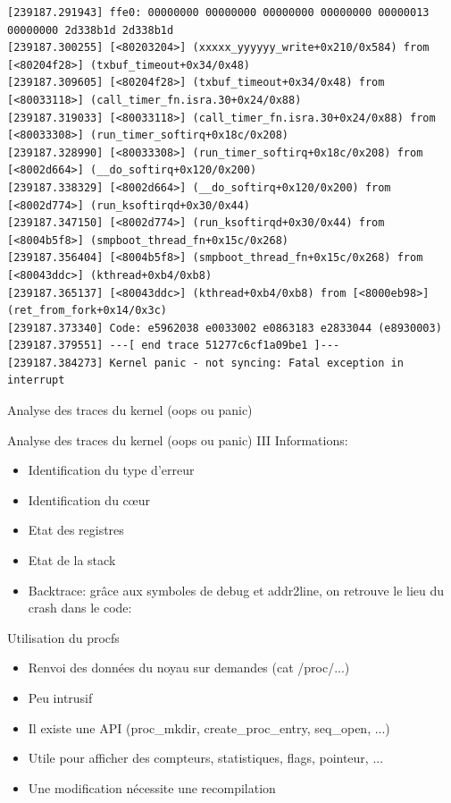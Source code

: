 {\begin{lstlisting}[style=customshell]
[239187.291943] ffe0: 00000000 00000000 00000000 00000000 00000013 00000000 2d338b1d 2d338b1d
[239187.300255] [<80203204>] (xxxxx_yyyyyy_write+0x210/0x584) from [<80204f28>] (txbuf_timeout+0x34/0x48)
[239187.309605] [<80204f28>] (txbuf_timeout+0x34/0x48) from [<80033118>] (call_timer_fn.isra.30+0x24/0x88)
[239187.319033] [<80033118>] (call_timer_fn.isra.30+0x24/0x88) from [<80033308>] (run_timer_softirq+0x18c/0x208)
[239187.328990] [<80033308>] (run_timer_softirq+0x18c/0x208) from [<8002d664>] (__do_softirq+0x120/0x200)
[239187.338329] [<8002d664>] (__do_softirq+0x120/0x200) from [<8002d774>] (run_ksoftirqd+0x30/0x44)
[239187.347150] [<8002d774>] (run_ksoftirqd+0x30/0x44) from [<8004b5f8>] (smpboot_thread_fn+0x15c/0x268)
[239187.356404] [<8004b5f8>] (smpboot_thread_fn+0x15c/0x268) from [<80043ddc>] (kthread+0xb4/0xb8)
[239187.365137] [<80043ddc>] (kthread+0xb4/0xb8) from [<8000eb98>] (ret_from_fork+0x14/0x3c)
[239187.373340] Code: e5962038 e0033002 e0863183 e2833044 (e8930003) 
[239187.379551] ---[ end trace 51277c6cf1a09be1 ]---
[239187.384273] Kernel panic - not syncing: Fatal exception in interrupt
\end{lstlisting}}

\begin{frame}[allowframebreaks]{Analyse des traces du kernel (oops ou panic)}
	\oops
\end{frame}
\begin{frame}{Analyse des traces du kernel (oops ou panic) III}
	Informations:
	\begin{itemize}
		\item
			Identification du type d'erreur
		\item
			Identification du cœur
		\item
			Etat des registres
		\item
			Etat de la stack
		\item
			Backtrace: grâce aux symboles de debug et addr2line, on retrouve le lieu du crash dans le code:
			\addrline
	\end{itemize}
\end{frame}

\begin{frame}{Utilisation du procfs}
	\begin{itemize}
		\item
			Renvoi des données du noyau sur demandes (cat /proc/...)
		\item
			Peu intrusif
		\item
			Il existe une API (proc\_mkdir, create\_proc\_entry, seq\_open, ...)
		\item
			Utile pour afficher des compteurs, statistiques, flags, pointeur, ...
		\item
			Une modification nécessite une recompilation
	\end{itemize}
\end{frame}

